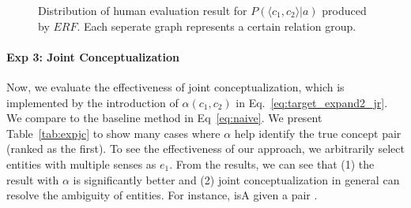 %




%

\begin{figure*}[htb]
\vspace{-12mm}
\centering
{}
\vspace{-8mm}
\caption{Distribution of human evaluation result for $P(\langle c_1,c_2 \rangle|a)$ produced by $ERF$. \small Each seperate graph represents a certain relation group.}
\label{fig:eva_violin_group}
\vspace{-10mm}
\end{figure*}

\vspace{-4mm}
\paragraph*{Exp 3: Joint Conceptualization}
Now, we evaluate the effectiveness of joint conceptualization, which is implemented by the introduction of $\alpha(c_1,c_2)$ in Eq.~\ref{eq:target_expand2_jr}. 
We compare to the baseline method in Eq~\ref{eq:naive}.
We present Table~\ref{tab:expjc} to show many cases where $\alpha$ help identify the true concept pair (ranked as the first).
To see the effectiveness of our approach, we arbitrarily select entities with multiple senses as $e_1$. 
From the results, we can see that (1) the result with $\alpha$ is significantly better and (2) joint conceptualization in general can resolve the ambiguity of entities. For instance,  isA  given a pair .



